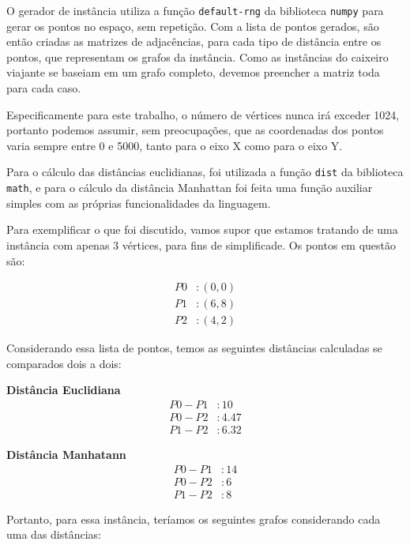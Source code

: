 \documentclass{article}
\begin{document}
O gerador de instância utiliza a função \texttt{default-rng} da biblioteca \texttt{numpy} para gerar os pontos no espaço, sem repetição. Com a lista de pontos gerados, são então criadas as matrizes de adjacências, para cada tipo de distância entre os pontos, que representam os grafos da instância. Como as instâncias do caixeiro viajante se baseiam em um grafo completo, devemos preencher a matriz toda para cada caso.

Especificamente para este trabalho, o número de vértices nunca irá exceder 1024, portanto podemos assumir, sem preocupações, que as coordenadas dos pontos varia sempre entre 0 e 5000, tanto para o eixo X como para o eixo Y. 

Para o cálculo das distâncias euclidianas, foi utilizada a função \texttt{dist} da biblioteca \texttt{math}, e para o cálculo da distância Manhattan foi feita uma função auxiliar simples com as próprias funcionalidades da linguagem.

Para exemplificar o que foi discutido, vamos supor que estamos tratando de uma instância com apenas 3 vértices, para fins de simplificade. Os pontos em questão são:

\begin{align*}
    P0 & : (0, 0) \\
    P1 & : (6, 8) \\
    P2 & : (4, 2)
\end{align*}

Considerando essa lista de pontos, temos as seguintes distâncias calculadas se comparados dois a dois:

\begin{multicols}{2}

\textbf{Distância Euclidiana}
\begin{align*}
    P0 - P1 & : 10 \\
    P0 - P2 & : 4.47 \\
    P1 - P2 & : 6.32
\end{align*}

\columnbreak

\textbf{Distância Manhatann}
\begin{align*}
    P0 - P1 & : 14 \\
    P0 - P2 &: 6 \\
    P1 - P2 & : 8
\end{align*}
\end{multicols}

Portanto, para essa instância, teríamos os seguintes grafos considerando cada uma das distâncias:
\end{document}
